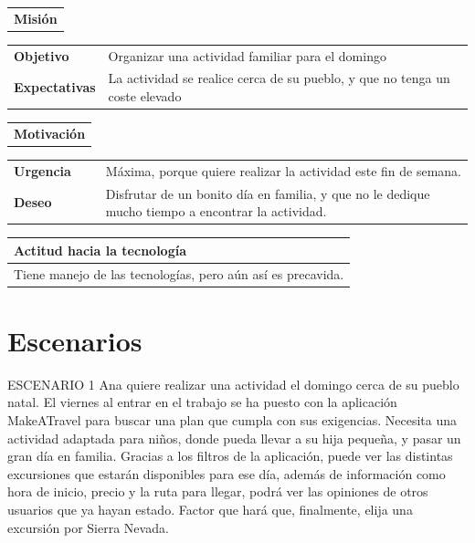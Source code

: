 \documentclass[11pt]{article}
\begin{document}
\begin{table}[H]
  \begin{tabular}{l}
    \textbf{Misión} 
  \end{tabular}
  
  \begin{tabular}{p{0.2\linewidth}|p{0.8\linewidth}}
    \toprule
    \textbf{Objetivo} & Organizar una actividad familiar para el domingo\\
    \textbf{Expectativas}  & La actividad se realice cerca de su pueblo, y que no tenga un coste elevado \\
    \bottomrule
  \end{tabular}

  \begin{tabular}{l}
    \textbf{Motivación} 
  \end{tabular}

  \begin{tabular}{p{0.2\linewidth}|p{0.8\linewidth}}
    \toprule
    \textbf{Urgencia} & Máxima, porque quiere realizar la actividad este fin de semana.\\
    \textbf{Deseo}  & Disfrutar de un bonito día en familia, y que no le dedique mucho tiempo a encontrar la actividad.\\
    \bottomrule
  \end{tabular}

  \begin{tabular}{p{1.028\linewidth}}
    \textbf{Actitud hacia la tecnología}\\
    \midrule
    Tiene manejo de las tecnologías, pero aún así es precavida.  
  \end{tabular}
\end{table}

\newpage
\section{Escenarios}
ESCENARIO 1
Ana quiere realizar una actividad el domingo cerca de su pueblo natal. El viernes al entrar en el trabajo se ha puesto con la aplicación MakeATravel para buscar una plan que cumpla con sus exigencias.
Necesita una actividad adaptada para niños, donde pueda llevar a su hija pequeña, y pasar un gran día en familia.
Gracias a los filtros de la aplicación, puede ver las distintas excursiones que estarán disponibles para ese día, además de información como hora de inicio, precio y la ruta para llegar, podrá ver las opiniones de otros usuarios que ya hayan estado. Factor que hará que, finalmente, elija una excursión por Sierra Nevada.
\end{document}
